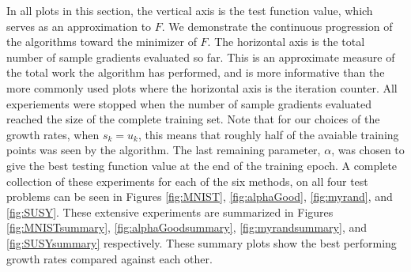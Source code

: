 \documentclass[11pt]{article}
\begin{document}
   In all plots in this section, the vertical axis is the test function value, which serves as an approximation to $F$. We demonstrate the continuous progression of the algorithms toward the minimizer of $F$. The horizontal axis is the total number of sample gradients evaluated so far. This is an approximate measure of the total work the algorithm has performed, and is more informative than the more commonly used plots where the horizontal axis is the iteration counter. All experiements were stopped when the number of sample gradients evaluated reached the size of the complete training set. Note that for our choices of the growth rates, when $s_k=u_k$, this means that roughly half of the avaiable training points was seen by the algorithm. 
  The last remaining parameter, $\alpha$, was chosen to give the best testing function value at the end of the training epoch. A complete collection of these experiments for each of the six methods, on all four test problems can be seen in Figures \ref{fig:MNIST}, \ref{fig:alphaGood}, \ref{fig:myrand}, and \ref{fig:SUSY}. These extensive experiments are summarized in Figures \ref{fig:MNISTsummary}, \ref{fig:alphaGoodsummary}, \ref{fig:myrandsummary}, and \ref{fig:SUSYsummary} respectively. These summary plots show the best performing growth rates compared against each other. 
\end{document}
